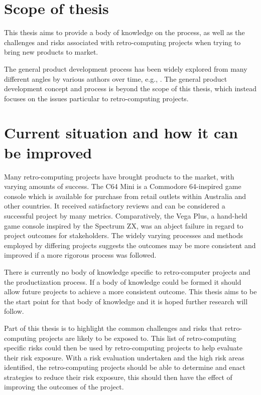 \section{Scope of thesis}
This thesis aims to provide a body of knowledge on the process, as well as the challenges and risks associated with retro-computing projects when trying to bring new products to market. 

The general product development process has been widely explored from many different angles by various authors over time, e.g., \cite{veryzer1998discontinuous,imai1984managing,schilling1998managing,morgan2006toyota,zahay2018managerial,sommer2015improved,stark2015product,rajagopalan2017exploring,chahin2016practical}.  The general product development concept and process is beyond the scope of this thesis, which instead focuses on the issues particular to retro-computing projects.

\section{Current situation and how it can be improved}
Many retro-computing projects have brought products to the market, with varying amounts of success. The C64 Mini is a Commodore 64-inspired game console which is available for purchase from retail outlets within Australia and other countries. It received satisfactory reviews and can be considered a successful project by many metrics. Comparatively, the Vega Plus, a hand-held game console inspired by the Spectrum ZX, was an abject failure in regard to project outcomes for stakeholders. The widely varying processes and methods employed by differing projects suggests the outcomes may be more consistent and improved if a more rigorous process was followed. 

There is currently no body of knowledge specific to retro-computer projects and the productization process. If a body of knowledge could be formed it should allow future projects to achieve a more consistent outcome. This thesis aims to be the start point for that body of knowledge and it is hoped further research will follow. 

Part of this thesis is to highlight the common challenges and risks that retro-computing projects are likely to be exposed to. This list of retro-computing specific risks could then be used by retro-computing projects to help evaluate their risk exposure. With a risk evaluation undertaken and the high risk areas identified, the retro-computing projects should be able to determine and enact strategies to reduce their risk exposure, this should then have the effect of improving the outcomes of the project.

